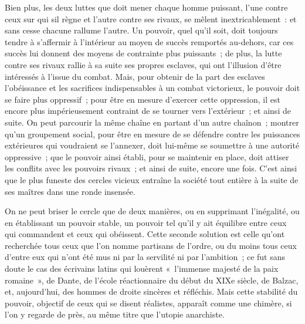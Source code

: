 \documentclass[french,twoside]{book} %
\begin{document}
Bien plus, les deux luttes que doit mener chaque homme puissant, l'une contre ceux sur qui sil règne et l'autre contre ses rivaux, se mêlent inextricablement : et sans cesse chacune rallume l'autre. Un pouvoir, quel qu'il soit, doit toujours tendre à s'affermir à l'intérieur au moyen de succès remportés au-dehors, car ces succès lui donnent des moyens de contrainte plus puissants ; de plus, la lutte contre ses rivaux rallie à sa suite ses propres esclaves, qui ont l'illusion d'être intéressés à l'issue du combat. Mais, pour obtenir de la part des esclaves l'obéissance et les sacrifices indispensables à un combat victorieux, le pouvoir doit se faire plus oppressif ; pour être en mesure d'exercer cette oppression, il est encore plus impérieusement contraint de se tourner vers l'extérieur ; et ainsi de suite. On peut parcourir la même chaîne en partant d'un autre chaînon ; montrer qu'un groupement social, pour être en mesure de se défendre contre les puissances extérieures qui voudraient se l'annexer, doit lui-même se soumettre à une autorité oppressive ; que le pouvoir ainsi établi, pour se maintenir en place, doit attiser les conflits avec les pouvoirs rivaux ; et ainsi de suite, encore une fois. C'est ainsi que le plus funeste des cercles vicieux entraîne la société tout entière à la suite de ses maîtres dans une ronde insensée.\par
On ne peut briser le cercle que de deux manières, ou en supprimant l'inégalité, ou en établissant un pouvoir stable, un pouvoir tel qu'il y ait équilibre entre ceux qui commandent et ceux qui obéissent. Cette seconde solution est celle qu'ont recherchée tous ceux que l'on nomme partisans de l'ordre, ou du moins tous ceux d'entre eux qui n'ont été mus ni par la servilité ni par l'ambition ; ce fut sans doute le cas des écrivains latins qui louèrent « l'immense majesté de la paix romaine », de Dante, de l'école réactionnaire du début du XIXe siècle, de Balzac, et, aujourd'hui, des hommes de droite sincères et réfléchis. Mais cette stabilité du pouvoir, objectif de ceux qui se disent réalistes, apparaît comme une chimère, si l'on y regarde de près, au même titre que l'utopie anarchiste.\par
\end{document}
